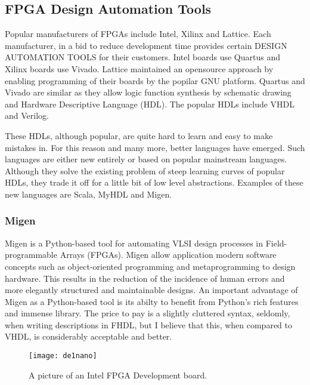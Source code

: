 \subsection{FPGA Design Automation Tools}
Popular manufacturers of FPGAs include Intel, Xilinx and Lattice. Each manufacturer, in a
bid to reduce development time provides certain DESIGN AUTOMATION TOOLS for their
customers. Intel boards use Quartus and Xilinx boards use Vivado. Lattice maintained an
opensource approach by enabling programming of their boards by the popilar GNU platform.
Quartus and Vivado are similar as they allow logic function synthesis by schematic drawing
and Hardware Descriptive Language (HDL). The popular HDLs include VHDL and Verilog. 

These HDLs, although popular, are quite hard to learn and easy to make mistakes in. For this reason and many more, better languages have emerged. Such languages are either new entirely or based on popular mainstream languages. Although they solve the existing problem of steep learning curves of popular HDLs, they trade it off for a little bit of low level abstractions. Examples of these new languages are Scala, MyHDL and Migen. 

\subsubsection{Migen}
Migen is a Python-based tool for automating  VLSI design processes in Field-programmable Arrays (FPGAs).
Migen allow application modern software concepts such as object-oriented programming and metaprogramming to design hardware. This results in the reduction of the incidence of human errors and more elegantly structured and maintainable designs.
An important advantage of Migen as a Python-based tool is its abilty to benefit from Python’s rich features and immense library. The price to pay is a slightly cluttered syntax, seldomly, when writing descriptions in FHDL, but I believe that this, when compared to VHDL, is considerably acceptable and better. 


\begin{figure}[p]
\texttt{[image: de1nano]}
\centering
\caption{A picture of an Intel FPGA Development board.}
\centering
\label{fig:fpga}


\end{figure}





